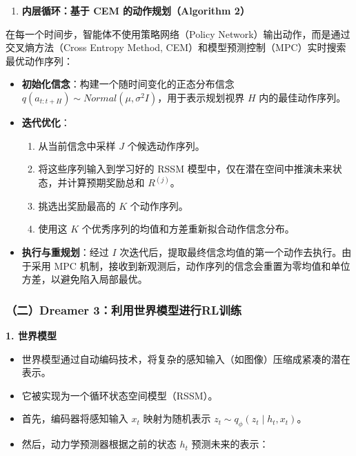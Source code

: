 \begin{enumerate}
\def\labelenumi{\arabic{enumi}.}
\setcounter{enumi}{1}
\tightlist
\item
  \textbf{内层循环：基于 CEM 的动作规划（Algorithm 2）}
\end{enumerate}

在每一个时间步，智能体不使用策略网络（Policy Network）输出动作，而是通过交叉熵方法（Cross Entropy Method, CEM）和模型预测控制（MPC）实时搜索最优动作序列：

\begin{itemize}
\tightlist
\item
  \textbf{初始化信念}：构建一个随时间变化的正态分布信念 \(q(a_{t:t+H}) \sim Normal(\mu, \sigma^2 I)\)，用于表示规划视界 \(H\) 内的最佳动作序列。
\item
  \textbf{迭代优化}：

  \begin{enumerate}
  \def\labelenumi{\arabic{enumi}.}
  \tightlist
  \item
    从当前信念中采样 \(J\) 个候选动作序列。
  \item
    将这些序列输入到学习好的 RSSM 模型中，仅在潜在空间中推演未来状态，并计算预期奖励总和 \(R^{(j)}\)。
  \item
    挑选出奖励最高的 \(K\) 个动作序列。
  \item
    使用这 \(K\) 个优秀序列的均值和方差重新拟合动作信念分布。
  \end{enumerate}
\item
  \textbf{执行与重规划}：经过 \(I\) 次迭代后，提取最终信念均值的第一个动作去执行。由于采用 MPC 机制，接收到新观测后，动作序列的信念会重置为零均值和单位方差，以避免陷入局部最优。
\end{itemize}

\hypertarget{ux4e8cdreamer-3ux5229ux7528ux4e16ux754cux6a21ux578bux8fdbux884crlux8badux7ec3}{%
\subsubsection{（二）Dreamer 3：利用世界模型进行RL训练}\label{ux4e8cdreamer-3ux5229ux7528ux4e16ux754cux6a21ux578bux8fdbux884crlux8badux7ec3}}

\textbf{1. 世界模型}

\begin{itemize}
\tightlist
\item
  世界模型通过自动编码技术，将复杂的感知输入（如图像）压缩成紧凑的潜在表示。
\item
  它被实现为一个循环状态空间模型（RSSM）。
\item
  首先，编码器将感知输入 \(x_t\) 映射为随机表示 \(z_t \sim q_{\phi}(z_t \mid h_t, x_t)\)。
\item
  然后，动力学预测器根据之前的状态 \(h_t\) 预测未来的表示：
\end{itemize}

